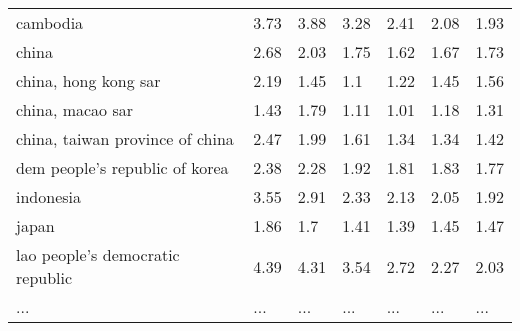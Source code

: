 \begin{table}
\begin{tabular}[t]{lllllll}
\addlinespace
cambodia & 3.73 & 3.88 & 3.28 & 2.41 & 2.08 & 1.93\\
china & 2.68 & 2.03 & 1.75 & 1.62 & 1.67 & 1.73\\
china, hong kong sar & 2.19 & 1.45 & 1.1 & 1.22 & 1.45 & 1.56\\
china, macao sar & 1.43 & 1.79 & 1.11 & 1.01 & 1.18 & 1.31\\
china, taiwan province of china & 2.47 & 1.99 & 1.61 & 1.34 & 1.34 & 1.42\\
\addlinespace
dem people's republic of korea & 2.38 & 2.28 & 1.92 & 1.81 & 1.83 & 1.77\\
indonesia & 3.55 & 2.91 & 2.33 & 2.13 & 2.05 & 1.92\\
japan & 1.86 & 1.7 & 1.41 & 1.39 & 1.45 & 1.47\\
lao people's democratic republic & 4.39 & 4.31 & 3.54 & 2.72 & 2.27 & 2.03\\
... & ... & ... & ... & ... & ... & ...\\
\bottomrule
\end{tabular}
\end{table}
